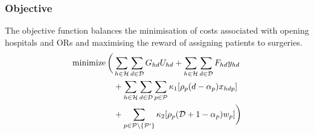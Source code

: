 \subsubsection*{Objective}

The objective function balances the minimisation of costs associated with opening hospitals
 and ORs and maximising the reward of assigning patients to surgeries. 
\begin{align}
\operatorname{minimize} \bigg( &\sum\limits_{h \in \mathcal{H}} \sum\limits_{d \in \mathcal{D}} G_{hd} U_{hd} 
 + \sum\limits_{h \in \mathcal{H}}\sum\limits_{d \in \mathcal{D}} F_{hd} y_{hd}
\\ &+ \sum\limits_{h \in \mathcal{H}} \sum\limits_{d \in \mathcal{D}} \sum\limits_{p \in \mathcal{P}} \notag
\kappa_{1} [\rho_{p} (d - \alpha_{p}) x_{hdp}]
\\ &+ \sum\limits_{p \in \mathcal{P} \setminus \lbrace \mathcal{P}{'} \rbrace } \kappa_{2} [\rho_{p}( \mathcal{D} + 1 -\alpha_{p} ) w_{p}]
\bigg)\notag
\end{align}

